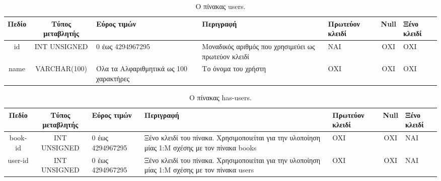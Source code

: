 \documentclass{assignment}
\begin{document}
\begin{landscape}
\begin{table}[htbp]
\begin{center}
  \begin{tabular}{|c|c|m{}|m{}|m{2.0cm}|c|m{1.5cm}|}
    \hline
    {\bf Πεδίο} & {\bf Τύπος μεταβλητής} & {\bf Εύρος τιμών} & {\bf Περιγραφή} & {\bf Πρωτεύον κλειδί} & {\bf Null} & {\bf Ξένο κλειδί} \\ \hline
    id & INT UNSIGNED & 0 έως 4294967295 & Μοναδικός αριθμός που χρησιμεύει ως πρωτεύον κλειδί & ΝΑΙ & ΟΧΙ & ΟΧΙ \\ \hline
    name & VARCHAR(100) & Όλα τα Αλφαριθμητικά ως 100 χαρακτήρες & Το όνομα του χρήστη & ΟΧΙ & ΟΧΙ & ΟΧΙ \\ \hline
  \end{tabular}
\caption{Ο πίνακας users.}
\label{table:db_table:users}
\end{center}
\end{table}

\begin{table}[htbp]
\begin{center}
  \begin{tabular}{|c|c|m{}|m{}|m{2.0cm}|c|m{1.5cm}|}
    \hline
    {\bf Πεδίο} & {\bf Τύπος μεταβλητής} & {\bf Εύρος τιμών} & {\bf Περιγραφή} & {\bf Πρωτεύον κλειδί} & {\bf Null} & {\bf Ξένο κλειδί} \\ \hline
    book-id & INT UNSIGNED & 0 έως 4294967295 & Ξένο κλειδί του πίνακα. Χρησιμοποιείται για την υλοποίηση μίας 1:Μ σχέσης με τον πίνακα books & OXI & ΟΧΙ & NAI \\ \hline
    user-id & INT UNSIGNED & 0 έως 4294967295 & Ξένο κλειδί του πίνακα. Χρησιμοποιείται για την υλοποίηση μίας 1:Μ σχέσης με τον πίνακα users & OXI & ΟΧΙ & NAI \\ \hline
  \end{tabular}
\caption{Ο πίνακας has-users.}
\label{table:db_table:has-users}
\end{center}
\end{table}
\end{landscape}
\end{document}

